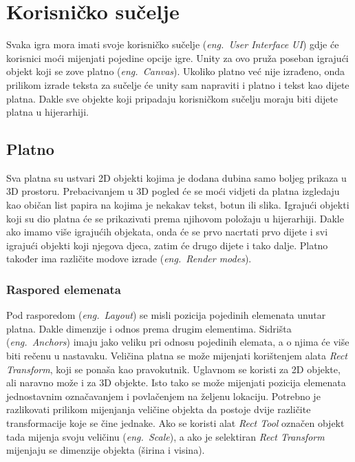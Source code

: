 \section{Korisničko sučelje}
Svaka igra mora imati svoje korisničko sučelje (\emph{eng.~User Interface UI}) gdje će korisnici moći mijenjati pojedine opcije igre. Unity za ovo pruža poseban igrajući objekt koji se zove platno (\emph{eng.~Canvas}). Ukoliko platno već nije izrađeno, onda prilikom izrade teksta za sučelje će unity sam napraviti i platno i tekst kao dijete platna. Dakle sve objekte koji pripadaju korisničkom sučelju moraju biti dijete platna u hijerarhiji.
\subsection{Platno}
Sva platna su ustvari 2D objekti kojima je dodana dubina samo boljeg prikaza u 3D prostoru. Prebacivanjem u 3D pogled će se moći vidjeti da platna izgledaju kao običan list papira na kojima je nekakav tekst, botun ili slika. Igrajući objekti koji su dio platna će se prikazivati prema njihovom položaju u hijerarhiji. Dakle ako imamo više igrajućih objekata, onda će se prvo nacrtati prvo dijete i svi igrajući objekti koji njegova djeca, zatim će drugo dijete i tako dalje. Platno također ima različite modove izrade (\emph{eng.~Render modes}).
\subsubsection{Raspored elemenata}
Pod rasporedom (\emph{eng.~Layout}) se misli pozicija pojedinih elemenata unutar platna. Dakle dimenzije i odnos prema drugim elementima. Sidrišta (\emph{eng.~Anchors}) imaju jako veliku pri odnosu pojedinih elemata, a o njima će više biti rečenu u nastavaku. Veličina platna se može mijenjati korištenjem alata \emph{Rect Transform}, koji se ponaša kao pravokutnik. Uglavnom se koristi za 2D objekte, ali naravno može i za 3D objekte. Isto tako se može mijenjati pozicija elemenata jednostavnim označavanjem i povlačenjem na željenu lokaciju. Potrebno je razlikovati prilikom mijenjanja veličine objekta da postoje dvije različite transformacije koje se čine jednake. Ako se koristi alat \emph{Rect Tool} označen objekt tada mijenja svoju veličinu (\emph{eng.~Scale}), a ako je selektiran \emph{Rect Transform} mijenjaju se dimenzije objekta (širina i visina). 
\newpage
